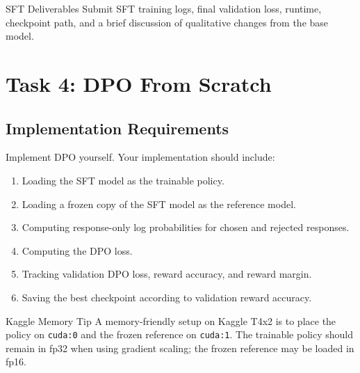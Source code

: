 \documentclass[11pt]{article}
\begin{document}
\begin{deliverablebox}{SFT Deliverables}
Submit SFT training logs, final validation loss, runtime, checkpoint path, and a brief discussion of qualitative changes from the base model.
\end{deliverablebox}

\section{Task 4: DPO From Scratch}

\subsection{Implementation Requirements}
Implement DPO yourself. Your implementation should include:
\begin{enumerate}[leftmargin=*]
  \item Loading the SFT model as the trainable policy.
  \item Loading a frozen copy of the SFT model as the reference model.
  \item Computing response-only log probabilities for chosen and rejected responses.
  \item Computing the DPO loss.
  \item Tracking validation DPO loss, reward accuracy, and reward margin.
  \item Saving the best checkpoint according to validation reward accuracy.
\end{enumerate}

\begin{warningbox}{Kaggle Memory Tip}
A memory-friendly setup on Kaggle T4x2 is to place the policy on \texttt{cuda:0} and the frozen reference on \texttt{cuda:1}. The trainable policy should remain in fp32 when using gradient scaling; the frozen reference may be loaded in fp16.
\end{warningbox}
\end{document}
